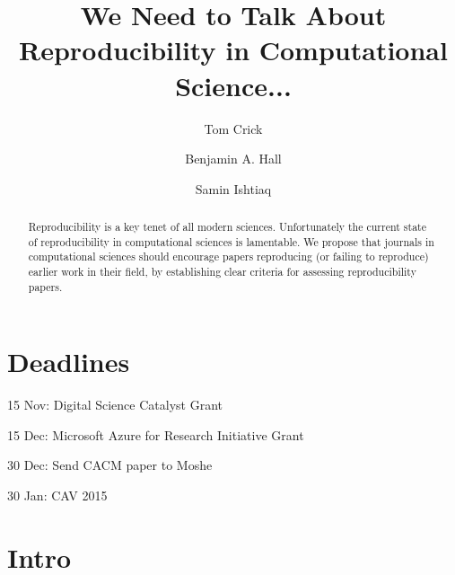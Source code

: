 \documentclass[a4paper,11pt]{article}
\begin{document}
\title{We Need to Talk About Reproducibility in Computational Science...}

\author[1]{Tom Crick}
\author[2]{Benjamin A. Hall}
\author[3]{Samin Ishtiaq}




\date{ }
\maketitle

\begin{abstract}
Reproducibility is a key tenet of all modern sciences.  Unfortunately
the current state of reproducibility in computational sciences is
lamentable.  We propose that journals in computational sciences should
encourage papers reproducing (or failing to reproduce) earlier work in
their field, by establishing clear criteria for assessing
reproducibility papers.
\end{abstract}


\section*{Deadlines}
\begin{compactdesc}
\item[15 Nov:] Digital Science Catalyst Grant
\item[15 Dec:] Microsoft Azure for Research Initiative Grant
\item[30 Dec:] Send CACM paper to Moshe
\item[30 Jan:] CAV 2015
\end{compactdesc}

\section{Intro}
\end{document}
